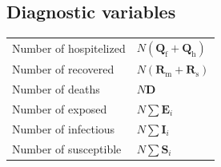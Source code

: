 \documentclass[twoside,11pt]{article}
\newcommand{\rmf}{\mathrm{f}}
\newcommand{\rmh}{\mathrm{h}}
\newcommand{\rmm}{\mathrm{m}}
\newcommand{\rms}{\mathrm{s}}
\newcommand{\bmD}{{\mathbf{D}}}
\newcommand{\bmE}{{\mathbf{E}}}
\newcommand{\bmI}{{\mathbf{I}}}
\newcommand{\bmQ}{{\mathbf{Q}}}
\newcommand{\bmR}{{\mathbf{R}}}
\newcommand{\bmS}{{\mathbf{S}}}
\begin{document}
\subsection{Diagnostic variables}
\begin{center}
\begin{tabular}{ll}
\hline
Number of hospitelized & $N(\bmQ_\rmf + \bmQ_\rmh)$ \\
Number of recovered    & $N(\bmR_\rmm+\bmR_\rms)$ \\
Number of deaths       & $N\bmD$ \\
Number of exposed      & $N\sum \bmE_i$ \\
Number of infectious   & $N\sum \bmI_i$ \\
Number of susceptible  & $N\sum \bmS_i$ \\
\hline
\end{tabular}
\end{center}




\end{document}

